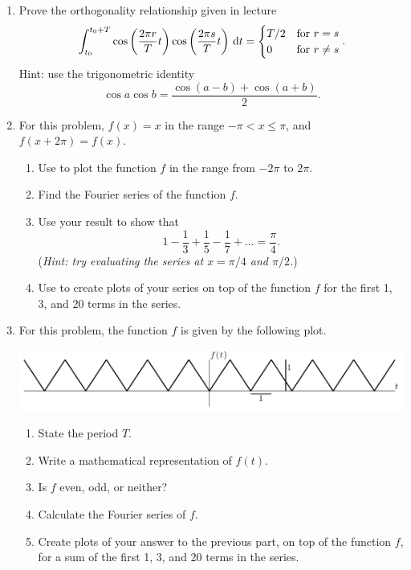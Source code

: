 \documentclass[12pt,twoside,a4paper]{article}
\begin{document}
\begin{enumerate}
\item Prove the orthogonality relationship given in lecture
  \begin{displaymath}
    \int_{t_0}^{t_0+T}\cos\left(\frac{2\pi r}{T}t\right)
    \cos\left(\frac{2\pi s}{T}t\right)\,\textrm{d} t=
    \begin{cases}
      T/2 & \text{for $r=s$} \\
      0 & \text{for $r\ne s$}
    \end{cases}.
  \end{displaymath}
  Hint: use the trigonometric identity
  $$\cos a\cos b = \frac{\cos(a - b) + \cos(a+b)}{2}.$$
\item For this problem, $f(x) = x$ in the range $-\pi<x\le\pi$, and
  $f(x+2\pi) = f(x)$.
  \begin{enumerate}
  \item Use \Mlab to plot the function $f$ in the range from $-2\pi$
    to $2\pi$.
  \item Find the Fourier series of the function $f$.
  \item Use your result to show that
    $$1 - \frac{1}{3} + \frac{1}{5} - \frac{1}{7} + ... =
    \frac{\pi}{4}.$$ (\textit{Hint: try evaluating the series at
      $x=\pi/4$ and $\pi/2$.})
  \item Use \Mlab to create plots of your series on top of the
    function $f$ for the first 1, 3, and 20 terms in the series.
  \end{enumerate}
\item For this problem, the function $f$ is given by the following
  plot.
  \begin{center}
    \includegraphics[width=6in]{../figs/L14/JaggedFunction}
  \end{center}
  \begin{enumerate}
  \item State the period $T$.
  \item Write a mathematical representation of $f(t)$.
  \item Is $f$ even, odd, or neither?
  \item Calculate the Fourier series of $f$.
  \item Create plots of your answer to the previous part, on top of
    the function $f$, for a sum of the first 1, 3, and 20 terms in the
    series.
  \end{enumerate}
\end{enumerate}
\end{document}
